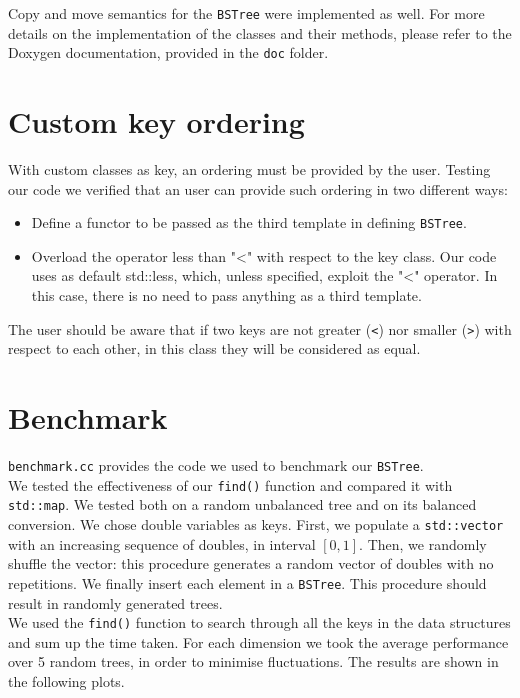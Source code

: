 \documentclass[12pt,a4paper,openany]{scrartcl}
\begin{document}
	\noindent Copy and move semantics for the \texttt{BSTree} were implemented as well. For more details on the implementation of the classes and their methods, please refer to the Doxygen documentation, provided in the \texttt{doc} folder.
	
\section{Custom key ordering}
	With custom classes as key, an ordering must be provided by the user. Testing our code we verified that an user can provide such ordering in two different ways:
		
	\begin{itemize}
		\item Define a functor to be passed as the third template in defining \texttt{BSTree}.
		\item Overload the operator less than "<" with respect to the key class. Our code uses as default std::less, which, unless specified, exploit the "<" operator. In this case, there is no need to pass anything as a third template.
	\end{itemize}
	
	\noindent The user should be aware that if two keys are not greater (\texttt{<}) nor  smaller (\texttt{>}) with respect to each other, in this class they will be considered as equal.
	
	\section{Benchmark}
	\texttt{benchmark.cc} provides the code we used to benchmark our \texttt{BSTree}.\\
	We tested the effectiveness of our \texttt{find()} function and compared it with \texttt{std::map}. We tested both on a random unbalanced tree and on its balanced conversion. We chose double variables as keys. First, we populate a \texttt{std::vector} with an increasing sequence of doubles, in interval $[0,1]$. Then, we randomly shuffle the vector: this procedure generates a random vector of doubles with no repetitions. We finally insert each element in a \texttt{BSTree}. This procedure should result in randomly generated trees.\\
	
	\noindent We used the \texttt{find()} function to search through all the keys in the data structures and sum up the time taken. For each dimension we took the average performance over 5 random trees, in order to minimise fluctuations. The results are shown in the following plots.
	
\end{document}
